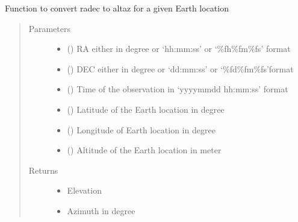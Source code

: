 \documentclass[letterpaper,10pt,english]{sphinxmanual}
\begin{document}
\begin{fulllineitems}
\label{\detokenize{paircars:paircars.basic_func.radec_to_altaz}}
\sphinxAtStartPar
Function to convert radec to altaz for a given Earth location
\begin{quote}\begin{description}
\item[{Parameters}] \leavevmode\begin{itemize}
\item {} 
\sphinxAtStartPar
{} () \textendash{} RA either in degree or ‘hh:mm:ss’ or ‘\%fh\%fm\%fs’ format

\item {} 
\sphinxAtStartPar
{} () \textendash{} DEC either in degree or ‘dd:mm:ss’ or ‘\%fd\%fm\%fs’format

\item {} 
\sphinxAtStartPar
{} () \textendash{} Time of the observation in ‘yyyy\sphinxhyphen{}mm\sphinxhyphen{}dd hh:mm:ss’ format

\item {} 
\sphinxAtStartPar
{} () \textendash{} Latitude of the Earth location in degree

\item {} 
\sphinxAtStartPar
{} () \textendash{} Longitude of Earth location in degree

\item {} 
\sphinxAtStartPar
{} () \textendash{} Altitude of the Earth location in meter

\end{itemize}

\item[{Returns}] \leavevmode
\sphinxAtStartPar
\begin{itemize}
\item {} 
\sphinxAtStartPar
{} \textendash{} Elevation

\item {} 
\sphinxAtStartPar
{} \textendash{} Azimuth in degree

\end{itemize}


\end{description}\end{quote}

\end{fulllineitems}
\end{document}
